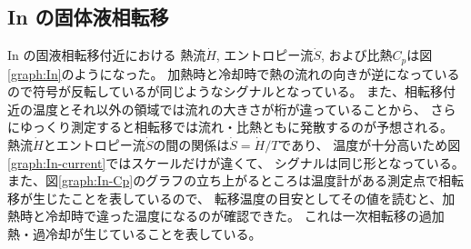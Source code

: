 \documentclass[9pt,dvipdfmx,a4paper]{jsarticle}
\begin{document}
\subsection{In の固体液相転移}
In の固液相転移付近における
熱流\(\dot{H}\), エントロピー流\(\dot{S}\), および比熱\(C_p\)は図\ref{graph:In}のようになった。
加熱時と冷却時で熱の流れの向きが逆になっているので符号が反転しているが同じようなシグナルとなっている。
また、相転移付近の温度とそれ以外の領域では流れの大きさが桁が違っていることから、
さらにゆっくり測定すると相転移では流れ・比熱ともに発散するのが予想される。
熱流\(\dot{H}\)とエントロピー流\(\dot{S}\)の間の関係は\(\dot{S}=\dot{H}/T\)であり、
温度が十分高いため図\ref{graph:In-current}ではスケールだけが違くて、
シグナルは同じ形となっている。
また、図\ref{graph:In-Cp}のグラフの立ち上がるところは温度計がある測定点で相転移が生じたことを表しているので、
転移温度の目安としてその値を読むと、加熱時と冷却時で違った温度になるのが確認できた。
これは一次相転移の過加熱・過冷却が生じていることを表している。
\end{document}
